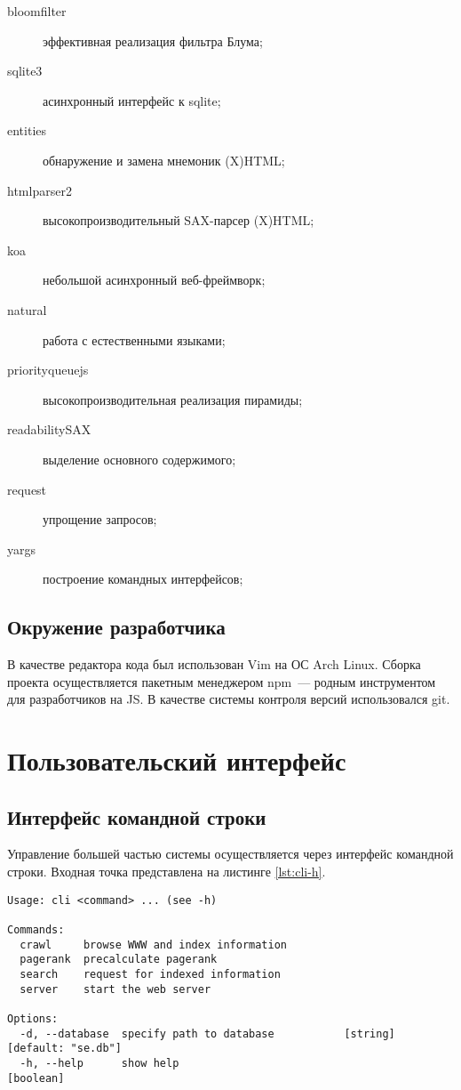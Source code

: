 \begin{description}
  \item[bloomfilter] эффективная реализация фильтра Блума;
  \item[sqlite3] асинхронный интерфейс к sqlite;
  \item[entities] обнаружение и замена мнемоник (X)HTML;
  \item[htmlparser2] высокопроизводительный SAX-парсер (X)HTML;
  \item[koa] небольшой асинхронный веб-фреймворк;
  \item[natural] работа с естественными языками;
  \item[priorityqueuejs] высокопроизводительная реализация пирамиды;
  \item[readabilitySAX] выделение основного содержимого;
  \item[request] упрощение запросов;
  \item[yargs] построение командных интерфейсов;
\end{description}


\subsection*{Окружение разработчика}
В качестве редактора кода был использован Vim на ОС Arch Linux. Сборка проекта осуществляется пакетным менеджером npm~--- родным инструментом для разработчиков на JS. В качестве системы контроля версий использовался git.


\section{Пользовательский интерфейс}
\subsection*{Интерфейс командной строки}
Управление большей частью системы осуществляется через интерфейс командной строки. Входная точка представлена на листинге \ref{lst:cli-h}.
\begin{lstlisting}[caption=Интерфейс командной строки., label=lst:cli-h]
Usage: cli <command> ... (see -h)

Commands:
  crawl     browse WWW and index information
  pagerank  precalculate pagerank
  search    request for indexed information
  server    start the web server

Options:
  -d, --database  specify path to database           [string] [default: "se.db"]
  -h, --help      show help                                            [boolean]
\end{lstlisting}


